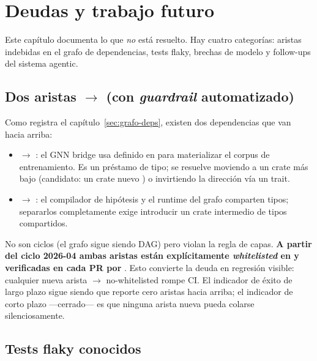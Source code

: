 \chapter{Deudas y trabajo futuro}
\label{sec:deudas}

Este capítulo documenta lo que \emph{no} está resuelto. Hay cuatro
categorías: aristas indebidas en el grafo de dependencias, tests
flaky, brechas de modelo y follow-ups del sistema agentic.

\section{Dos aristas  $\to$ 
(con \emph{guardrail} automatizado)}

Como registra el capítulo~\ref{sec:grafo-deps}, existen dos
dependencias que van hacia arriba:

\begin{itemize}
    \item {} $\to$
    : el GNN bridge usa
     definido en 
    para materializar el corpus de entrenamiento. Es un préstamo de
    tipo; se resuelve moviendo  a un crate más
    bajo (candidato: un crate nuevo )
    o invirtiendo la dirección vía un trait.
    \item {} $\to$ :
    el compilador de hipótesis y el runtime del grafo comparten
    tipos; separarlos completamente exige introducir un crate
    intermedio de tipos compartidos.
\end{itemize}

No son ciclos (el grafo sigue siendo DAG) pero violan la regla de
capas. \textbf{A partir del ciclo 2026-04 ambas aristas están
explícitamente \emph{whitelisted} en
 y verificadas
en cada PR por }. Esto convierte
la deuda en regresión visible: cualquier nueva arista
 $\to$  no-whitelisted rompe CI.
El indicador de éxito de largo plazo sigue siendo que
 reporte cero aristas hacia arriba; el
indicador de corto plazo ---cerrado--- es que ninguna arista nueva
pueda colarse silenciosamente.

\section{Tests flaky conocidos}


